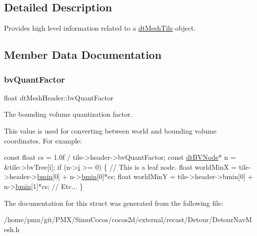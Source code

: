 \subsection{Detailed Description}
Provides high level information related to a \hyperlink{structdtMeshTile}{dt\+Mesh\+Tile} object. 

\subsection{Member Data Documentation}
\mbox{\label{structdtMeshHeader_ab415943e0064a6ed0501e8e7da0e5d26}} 
\subsubsection{\texorpdfstring{bv\+Quant\+Factor}{bvQuantFactor}}
{\footnotesize\ttfamily float dt\+Mesh\+Header\+::bv\+Quant\+Factor}



The bounding volume quantization factor. 

\begin{DoxyParagraph}{}

\end{DoxyParagraph}
This value is used for converting between world and bounding volume coordinates. For example\+: 
\begin{DoxyCode}
\textcolor{keyword}{const} \textcolor{keywordtype}{float} cs = 1.0f / tile->header->bvQuantFactor;
\textcolor{keyword}{const} \hyperlink{structdtBVNode}{dtBVNode}* n = &tile->bvTree[i];
\textcolor{keywordflow}{if} (n->\hyperlink{structdtBVNode_aa7de4b9e1151b9f4bf02154cfb24a45a}{i} >= 0)
\{
    \textcolor{comment}{// This is a leaf node.}
    \textcolor{keywordtype}{float} worldMinX = tile->header->\hyperlink{structdtBVNode_a2a19864d4c7d09982972331967f862fd}{bmin}[0] + n->\hyperlink{structdtBVNode_a2a19864d4c7d09982972331967f862fd}{bmin}[0]*cs;
    \textcolor{keywordtype}{float} worldMinY = tile->header->bmin[0] + n->\hyperlink{structdtBVNode_a2a19864d4c7d09982972331967f862fd}{bmin}[1]*cs;
    \textcolor{comment}{// Etc...}
\}
\end{DoxyCode}
 

The documentation for this struct was generated from the following file\+:\begin{DoxyCompactItemize}
\item 
/home/pmx/git/\+P\+M\+X/\+Simu\+Cocos/cocos2d/external/recast/\+Detour/Detour\+Nav\+Mesh.\+h\end{DoxyCompactItemize}
